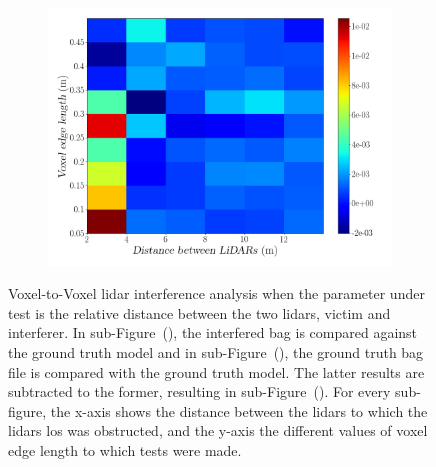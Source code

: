 \begin{figure}[!ht]
\begin{subfigure}[c]{0.45\textwidth}
	\label{fig:los:octree-ground-truth-color-mesh}
\end{subfigure}
\\ \vspace{4mm}
\begin{subfigure}[c]{0.6\textwidth}
	\includegraphics[width=\textwidth]{img/lidar-interference/LOS/octree_difference_color_mesh.png}
	\caption{}%
	\label{fig:los:octree-difference-color-mesh}
\end{subfigure}

\caption[Voxel-to-Voxel analysis when the \acsp{lidar} \acs{los} is obstructed and the distance between \acsp{lidar} is variated.]{Voxel-to-Voxel \ac{lidar} interference analysis when the parameter under test is the relative distance between the two \acp{lidar}, victim and interferer. In sub-Figure~(), the interfered bag is compared against the ground truth model and in sub-Figure~(), the ground truth bag file is compared with the ground truth model. The latter results are subtracted to the former, resulting in sub-Figure~(). For every sub-figure, the x-axis shows the distance between the \acp{lidar} to which the \acp{lidar} \ac{los} was obstructed, and the y-axis the different values of voxel edge length to which tests were made.}
\label{fig:los:octree-color-mesh}
\end{figure}

